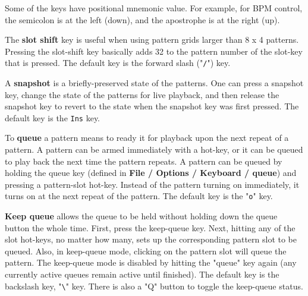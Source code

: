    Some of the keys have positional mnemonic value.  For example,
   for BPM control, the semicolon is at the left (down), and the apostrophe
   is at the right (up).

   The \textbf{slot shift} key is useful when using pattern grids larger
   than 8 x 4 patterns.  Pressing the slot-shift key basically adds 32 to the
   pattern number of the slot-key that is pressed.
   The default key is the forward slash ("\texttt{/}") key.

   A \textbf{snapshot} is a briefly-preserved state of the patterns.
   One can press a snapshot key, change the state of the patterns for live
   playback, and then release the snapshot key to revert to the state when
   the snapshot key was first pressed.
   The default key is the \texttt{Ins} key.

%
%

   To \textbf{queue}
   a pattern means to ready it for playback upon the next repeat
   of a pattern.  A pattern can be armed immediately with a hot-key,
   or it can be queued to play back the next time the pattern repeats.
   A pattern can be queued by holding the queue key (defined in
   \textbf{File / Options / Keyboard / queue}) and pressing a pattern-slot
   hot-key.  Instead of the pattern turning on
   immediately, it turns on at the next repeat of the pattern.
   The default key is the "\texttt{o}" key.

   \textbf{Keep queue}
   allows the queue to be held without holding
   down the queue button the whole time.  First, press the keep-queue key.
   Next, hitting
   any of the slot hot-keys, no matter how many, sets up the corresponding
   pattern slot to be queued.  Also, in keep-queue mode, clicking on the
   pattern slot will queue the pattern.  The keep-queue mode is disabled by
   hitting the "queue" key again (any currently active queues remain active
   until finished).
   The default key is the backslash key, "\texttt{\textbackslash}" key.
   There is also a "Q" button to toggle the keep-queue
   status.

